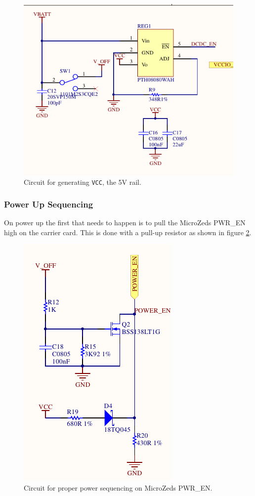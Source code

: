 \begin{figure}
	\centering
	\includegraphics[width=\linewidth]{graphics/5v}
	\caption{Circuit for generating \texttt{VCC}, the 5V rail.}
	\label{fig:pth08080}
\end{figure}

\subsubsection*{Power Up Sequencing}
On power up the first that needs to happen is to pull the MicroZeds PWR\_EN high on the carrier card.
This is done with a pull-up resistor as shown in figure \ref{fig:pwr_en_circuit}.

\begin{figure}
	\centering
	\includegraphics[width=.4\linewidth]{graphics/power_en_sch.pdf}
	\caption{Circuit for proper power sequencing on MicroZeds PWR\_EN.}
	\label{fig:pwr_en_circuit}
\end{figure}

